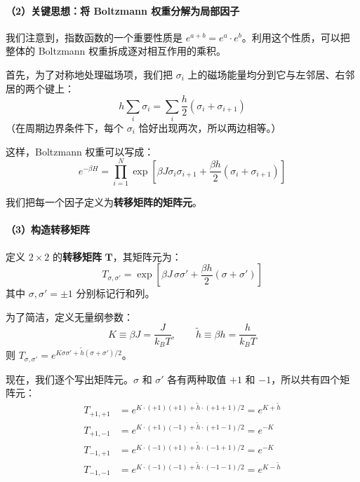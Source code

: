 \documentclass[12pt,a4paper]{ctexart}
\begin{document}
\paragraph{（2）关键思想：将 Boltzmann 权重分解为局部因子}

我们注意到，指数函数的一个重要性质是 $e^{a+b} = e^a \cdot e^b$。利用这个性质，可以把整体的 Boltzmann 权重拆成逐对相互作用的乘积。

首先，为了对称地处理磁场项，我们把 $\sigma_i$ 上的磁场能量均分到它与左邻居、右邻居的两个键上：
\begin{equation}
    h \sum_{i} \sigma_i = \sum_{i} \frac{h}{2}(\sigma_i + \sigma_{i+1})
\end{equation}
（在周期边界条件下，每个 $\sigma_i$ 恰好出现两次，所以两边相等。）

这样，Boltzmann 权重可以写成：
\begin{equation}
    e^{-\beta H} = \prod_{i=1}^{N} \exp\!\left[\beta J \sigma_i \sigma_{i+1} + \frac{\beta h}{2}(\sigma_i + \sigma_{i+1})\right]
\end{equation}

我们把每一个因子定义为\textbf{转移矩阵的矩阵元}。

\paragraph{（3）构造转移矩阵}

定义 $2 \times 2$ 的\textbf{转移矩阵} $\mathbf{T}$，其矩阵元为：
\begin{equation}
    T_{\sigma, \sigma'} = \exp\!\left[\beta J \,\sigma \sigma' + \frac{\beta h}{2}(\sigma + \sigma')\right]
\end{equation}
其中 $\sigma, \sigma' = \pm 1$ 分别标记行和列。

为了简洁，定义无量纲参数：
\[
K \equiv \beta J = \frac{J}{k_B T}, \qquad \tilde{h} \equiv \beta h = \frac{h}{k_B T}
\]
则 $T_{\sigma, \sigma'} = e^{K \sigma\sigma' + \tilde{h}(\sigma + \sigma')/2}$。

现在，我们逐个写出矩阵元。$\sigma$ 和 $\sigma'$ 各有两种取值 $+1$ 和 $-1$，所以共有四个矩阵元：
\begin{align}
T_{+1,+1} &= e^{K \cdot (+1)(+1) + \tilde{h} \cdot (+1+1)/2} = e^{K + \tilde{h}} \\
T_{+1,-1} &= e^{K \cdot (+1)(-1) + \tilde{h} \cdot (+1-1)/2} = e^{-K} \\
T_{-1,+1} &= e^{K \cdot (-1)(+1) + \tilde{h} \cdot (-1+1)/2} = e^{-K} \\
T_{-1,-1} &= e^{K \cdot (-1)(-1) + \tilde{h} \cdot (-1-1)/2} = e^{K - \tilde{h}}
\end{align}
\end{document}
